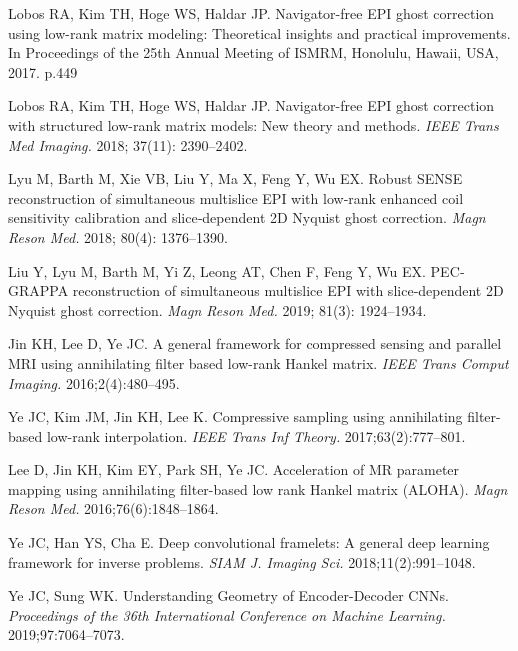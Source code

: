 \documentclass[num-refs]{wiley-article}
\newcommand{\0}{{\boldsymbol{0}}}
\newcommand{\1}{\blmath{1}}
\begin{document}
\begin{thebibliography}{10}
		Lobos RA, Kim TH, Hoge WS, Haldar JP. 
		\newblock Navigator-free EPI ghost correction using low-rank matrix modeling: Theoretical insights and practical improvements.
		\newblock In Proceedings of the 25th Annual Meeting of ISMRM, Honolulu, Hawaii, USA, 2017. p.449
		
		Lobos RA, Kim TH, Hoge WS, Haldar JP. 
		\newblock Navigator-free EPI ghost correction with structured low-rank matrix models: New theory and methods.
		\newblock \textit{IEEE Trans Med Imaging.} 2018; 37(11): 2390--2402.	
		
		Lyu M, Barth M, Xie VB, Liu Y, Ma X, Feng Y, Wu EX. 
		\newblock Robust SENSE reconstruction of simultaneous multislice EPI with low‐rank enhanced coil sensitivity calibration and slice‐dependent 2D Nyquist ghost correction.
		\newblock \textit{Magn Reson Med.} 2018; 80(4): 1376--1390.
		
		Liu Y, Lyu M, Barth M, Yi Z, Leong AT, Chen F, Feng Y, Wu EX. 
		\newblock PEC‐GRAPPA reconstruction of simultaneous multislice EPI with slice‐dependent 2D Nyquist ghost correction.
		\newblock \textit{Magn Reson Med.} 2019; 81(3): 1924--1934.
		
		Jin KH, Lee D, Ye JC.
		\newblock A general framework for compressed sensing and parallel MRI using annihilating filter based low-rank Hankel matrix.
		\newblock \textit{IEEE Trans Comput Imaging.} 2016;2(4):480–495.
		
		Ye JC, Kim JM, Jin KH, Lee K. 
		\newblock Compressive sampling using annihilating filter-based low-rank interpolation.
		\newblock \textit{IEEE Trans Inf Theory.} 2017;63(2):777–801.
		
		Lee D, Jin KH, Kim EY, Park SH, Ye JC.
		\newblock Acceleration of MR parameter mapping using annihilating filter-based low rank Hankel matrix (ALOHA).
		\newblock \textit{Magn Reson Med.} 2016;76(6):1848–1864.
		
		Ye JC, Han YS, Cha E.
		\newblock Deep convolutional framelets: A general deep learning framework for inverse problems.
		\newblock \textit{SIAM J. Imaging Sci.} 2018;11(2):991–1048.
		
		Ye JC, Sung WK.
		\newblock Understanding Geometry of Encoder-Decoder CNNs.
		\newblock \textit{Proceedings of the 36th International Conference on Machine
			Learning.} 2019;97:7064--7073.
		

\end{thebibliography}
\end{document}
